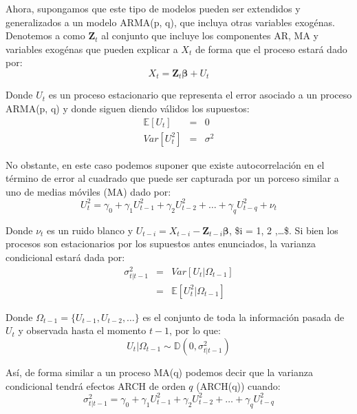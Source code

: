 \documentclass[
]{book}
\begin{document}
Ahora, supongamos que este tipo de modelos pueden ser extendidos y generalizados a un modelo ARMA(p, q), que incluya otras variables exogénas. Denotemos a como \(\mathbf{Z}_t\) al conjunto que incluye los componentes AR, MA y variables exogénas que pueden explicar a \(X_t\) de forma que el proceso estará dado por:
\begin{equation}
    X_t = \mathbf{Z}_t \boldsymbol{\beta} + U_t
\end{equation}

Donde \(U_t\) es un proceso estacionario que representa el error asociado a un proceso ARMA(p, q) y donde siguen diendo válidos los supuestos:
\begin{eqnarray*}
    \mathbb{E}[U_t] & = & 0 \\
    Var[U_t^2] & = & \sigma^2
\end{eqnarray*}

No obstante, en este caso podemos suponer que existe autocorrelación en el término de error al cuadrado que puede ser capturada por un porceso similar a uno de medias móviles (MA) dado por:
\begin{equation}
    U_t^2 = \gamma_0 + \gamma_1 U_{t-1}^2 + \gamma_2 U_{t-2}^2 + \ldots + \gamma_q U_{t-q}^2 + \nu_t
\end{equation}

Donde \(\nu_t\) es un ruido blanco y \(U_{t-i} = X_{t-i} - \mathbf{Z}_{t-i} \boldsymbol{\beta}\), \$i = 1, 2 ,\ldots \$. Si bien los procesos son estacionarios por los supuestos antes enunciados, la varianza condicional estará dada por:
\begin{eqnarray*}
    \sigma^2_{t | t-1} & = & Var[ U_t | \Omega_{t-1} ] \\
    & = & \mathbb{E}[ U^2_t | \Omega_{t-1} ]
\end{eqnarray*}

Donde \(\Omega_{t-1} = \{U_{t-1}, U_{t-2}, \ldots \}\) es el conjunto de toda la información pasada de \(U_t\) y observada hasta el momento \(t-1\), por lo que:
\begin{equation*}
    U_t | \Omega_{t-1} \sim \mathbb{D}(0, \sigma^2_{t | t-1})
\end{equation*}

Así, de forma similar a un proceso MA(q) podemos decir que la varianza condicional tendrá efectos ARCH de orden \(q\) (ARCH(q)) cuando:
\begin{equation}
    \sigma^2_{t | t-1} = \gamma_0 + \gamma_1 U_{t-1}^2 + \gamma_2 U_{t-2}^2 + \ldots + \gamma_q U_{t-q}^2
    \label{eq:ARCHEffect}
\end{equation}
\end{document}
